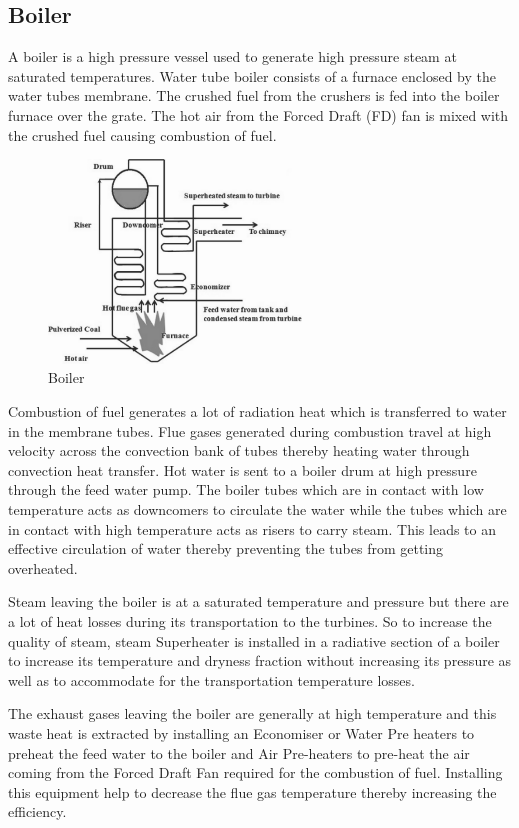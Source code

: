 \documentclass{report}
\begin{document}
\subsection{Boiler}
A boiler is a high pressure vessel used to generate high pressure steam at saturated temperatures. Water tube boiler consists of a furnace enclosed by the water tubes membrane. The crushed fuel from the crushers is fed into the boiler furnace over the grate. The hot air from the Forced Draft (FD) fan is mixed with the crushed fuel causing combustion of fuel.
\begin{figure}[H]
\centering \includegraphics[width=0.6\textwidth]{images/tpp3.PNG}
\caption{Boiler}
\end{figure}
Combustion of fuel generates a lot of radiation heat which is transferred to water in the membrane tubes. Flue gases generated during combustion travel at high velocity across the convection bank of tubes thereby heating water through convection heat transfer. Hot water is sent to a boiler drum at high pressure through the feed water pump. The boiler tubes which are in contact with low temperature acts as downcomers to circulate the water while the tubes which are in contact with high temperature acts as risers to carry steam. This leads to an effective circulation of water thereby preventing the tubes from getting overheated.

Steam leaving the boiler is at a saturated temperature and pressure but there are a lot of heat losses during its transportation to the turbines. So to increase the quality of steam, steam Superheater is installed in a radiative section of a boiler to increase its temperature and dryness fraction without increasing its pressure as well as to accommodate for the transportation temperature losses.

The exhaust gases leaving the boiler are generally at high temperature and this waste heat is extracted by installing an Economiser or Water Pre heaters to preheat the feed water to the boiler and Air Pre-heaters to pre-heat the air coming from the Forced Draft Fan required for the combustion of fuel. Installing this equipment help to decrease the flue gas temperature thereby increasing the efficiency.
\end{document}
